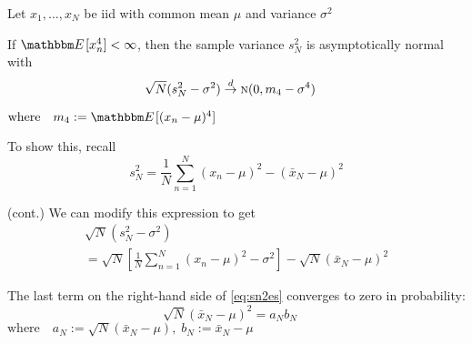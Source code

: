 \begin{frame}

    \Eg Let $x_1, \ldots, x_N$ be {\sc iid} with common 
    mean $\mu$ and variance $\sigma^2$
    
    If $\EE[x_n^4] < \infty$,
    then the sample variance $s_N^2$ is asymptotically normal
    with 
    \begin{equation}
        \label{eq:avarsn2}
        \sqrt{N}(s_N^2 - \sigma^2)
        \stackrel { d } {\to} \textrm{\sc n}(0, m_4 - \sigma^4)
        \quad 
    \end{equation}
    
    $\text{where} \quad
        m_4 := \EE[(x_n - \mu)^4]$
    
    \vspace{.7em}
    To show this, recall 
    \begin{equation}
        s_N^2 = \frac{1}{N} \sum_{n=1}^N (x_n - \mu)^2 - (\bar x_N - \mu)^2
    \end{equation}
        
\end{frame}

\begin{frame}
    
    \vspace{2em}
    \Eg (cont.) 
    We can modify this expression to get
    \begin{multline}
        \label{eq:sn2es}
        \sqrt{N}(s_N^2 - \sigma^2)
        \\ = \sqrt{N} 
        \left[ 
            \frac{1}{N} \sum_{n=1}^N (x_n - \mu)^2 - \sigma^2
        \right]
        -  \sqrt{N} (\bar x_N - \mu)^2 
    \end{multline}
    
    \vspace{.7em}
    The last term on the right-hand side of \eqref{eq:sn2es} 
    converges to zero in probability:
    \begin{equation*}
        \sqrt{N} (\bar x_N - \mu)^2
        = a_N b_N
        \quad 
    \end{equation*}
    $\text{where} \quad
        a_N := \sqrt{N} (\bar x_N - \mu), \;
        b_N := \bar x_N - \mu$
        
\end{frame}

